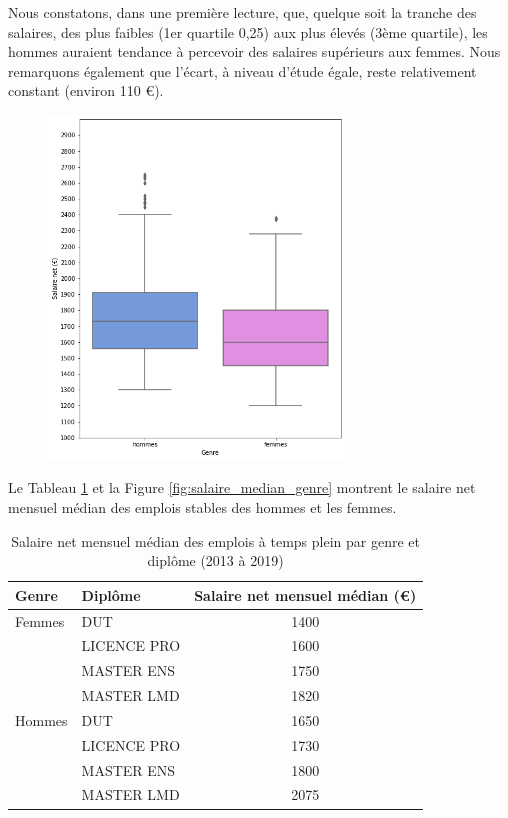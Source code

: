 \documentclass[12pt, a4paper, titlepage, table]{article}
\begin{document}
	
	Nous constatons, dans une première lecture, que, quelque soit la tranche des salaires, des plus faibles (1er quartile 0,25) aux plus élevés (3ème quartile), les hommes auraient tendance à percevoir des salaires supérieurs aux femmes. Nous remarquons également que l'écart, à niveau d'étude égale, reste relativement constant (environ 110 €).
		
	
	\begin{figure}[H]
		\centering
		\includegraphics[width=0.7\textwidth]{../graphs/boxplot_salaire_genre.png}
		\label{fig:boxplot_salaire_genre}
	\end{figure}
	

	Le Tableau \ref{tab:salaire_median_genre} et la Figure \ref{fig:salaire_median_genre} montrent le salaire net mensuel médian des emplois stables des hommes et les femmes. 
	
	\begin{table}[H]
		\centering
		\begin{tabular}{llc}
			\toprule
			\textbf{Genre} & \textbf{Diplôme} & \textbf{Salaire net mensuel médian (€)} \\
			\midrule
			Femmes & DUT & 1400 \\
			& LICENCE PRO & 1600 \\
			& MASTER ENS & 1750 \\
			& MASTER LMD & 1820 \\
			\midrule
			Hommes & DUT & 1650 \\
			& LICENCE PRO & 1730 \\
			& MASTER ENS & 1800 \\
			& MASTER LMD & 2075 \\
			\bottomrule
		\end{tabular}
		\caption{Salaire net mensuel médian des emplois à temps plein par genre et diplôme (2013 à 2019)}
		\label{tab:salaire_median_genre}
	\end{table}
	
\end{document}
